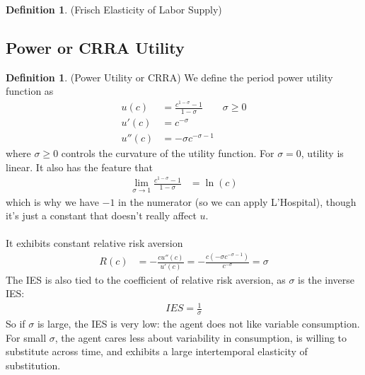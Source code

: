 \documentclass[12pt]{article}
\theoremstyle{plain}
\theoremstyle{definition}
\newtheorem{defn}[thm]{Definition}
\theoremstyle{remark}
\newcommand{\ra}{\rightarrow}
\begin{document}
\begin{defn}(Frisch Elasticity of Labor Supply)

\end{defn}



\clearpage
\subsection{Power or CRRA Utility}

\begin{defn}(Power Utility or CRRA)
We define the period power utility function as
\begin{align*}
  u(c) &= \frac{c^{1-\sigma}-1}{1-\sigma}
  \qquad \sigma\geq 0
  \\
  u'(c) &= c^{-\sigma} \\
  u''(c) &= -\sigma c^{-\sigma-1}
\end{align*}
where $\sigma\geq 0$ controls the curvature of the utility function.
For $\sigma=0$, utility is linear.
It also has the feature that
\begin{align*}
  \lim_{\sigma\ra 1}
  \frac{c^{1-\sigma}-1}{1-\sigma}
  &= \ln(c)
\end{align*}
which is why we have $-1$ in the numerator (so we can apply L'Hospital),
though it's just a constant that doesn't really affect $u$.
\\
\\
It exhibits constant relative risk aversion
\begin{align*}
  R(c) &=
  -\frac{c u''(c)}{u'(c)}
  = -\frac{c (-\sigma c^{-\sigma-1})}{c^{-\sigma}}
  = \sigma
\end{align*}
The IES is also tied to the coefficient of relative risk aversion, as
$\sigma$ is the inverse IES:
\begin{align*}
  IES
  = \frac{1}{\sigma}
\end{align*}
So if $\sigma$ is large, the IES is very low: the agent does not like
variable consumption. For small $\sigma$, the agent cares less about
variability in consumption, is willing to substitute across time, and
exhibits a large intertemporal elasticity of substitution.
\end{defn}
\end{document}
